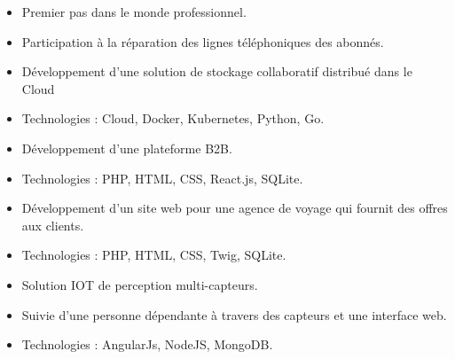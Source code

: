
\begin{itemize}
\item Premier pas dans le monde professionnel.
\item Participation à la réparation des lignes téléphoniques des abonnés.
\end{itemize}


\begin{itemize}
\item Développement d'une solution de stockage collaboratif distribué dans le Cloud
\item Technologies : Cloud, Docker, Kubernetes, Python, Go.
\end{itemize}

\divider

\begin{itemize}
\item Développement d'une plateforme B2B.
\item Technologies : PHP, HTML, CSS, React.js, SQLite.
\end{itemize}

\divider

\begin{itemize}
\item Développement d'un site web pour une agence de voyage qui fournit des offres aux clients.
\item Technologies : PHP, HTML, CSS, Twig, SQLite.
\end{itemize}

\divider

\begin{itemize}
\item Solution IOT de perception multi-capteurs.
\item Suivie d'une personne dépendante à travers des capteurs et une interface web.    
\item Technologies : AngularJs, NodeJS, MongoDB.
\end{itemize}

